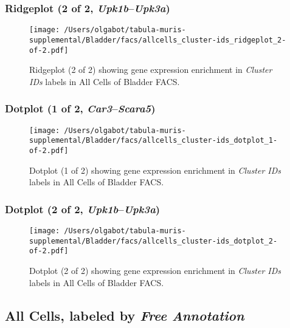 \clearpage

\subsubsection{Ridgeplot (2 of 2, \emph{Upk1b}--\emph{Upk3a})}
\begin{figure}[h]
\centering
\texttt{[image: /Users/olgabot/tabula-muris-supplemental/Bladder/facs/allcells\_cluster-ids\_ridgeplot\_2-of-2.pdf]}

\caption{ Ridgeplot (2 of 2)  showing gene expression enrichment in \emph{Cluster IDs} labels in All Cells of Bladder FACS. }
\end{figure}


\clearpage

\subsubsection{Dotplot (1 of 2, \emph{Car3}--\emph{Scara5})}
\begin{figure}[h]
\centering
\texttt{[image: /Users/olgabot/tabula-muris-supplemental/Bladder/facs/allcells\_cluster-ids\_dotplot\_1-of-2.pdf]}

\caption{ Dotplot (1 of 2)  showing gene expression enrichment in \emph{Cluster IDs} labels in All Cells of Bladder FACS. }
\end{figure}


\clearpage

\subsubsection{Dotplot (2 of 2, \emph{Upk1b}--\emph{Upk3a})}
\begin{figure}[h]
\centering
\texttt{[image: /Users/olgabot/tabula-muris-supplemental/Bladder/facs/allcells\_cluster-ids\_dotplot\_2-of-2.pdf]}

\caption{ Dotplot (2 of 2)  showing gene expression enrichment in \emph{Cluster IDs} labels in All Cells of Bladder FACS. }
\end{figure}


\clearpage

\subsection{All Cells, labeled by \emph{Free Annotation}}
